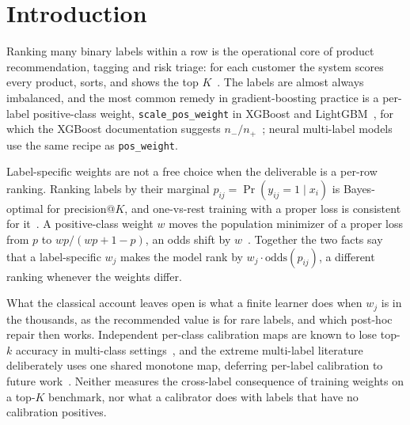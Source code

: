 \documentclass[sigconf,nonacm]{acmart}
\begin{document}
\maketitle

\section{Introduction}
\label{sec:intro}

Ranking many binary labels within a row is the operational core of product recommendation, tagging and risk triage: for each customer the system scores every product, sorts, and shows the top $K$~\cite{Jain2016XMLLoss,Menon2019Reductions}. The labels are almost always imbalanced, and the most common remedy in gradient-boosting practice is a per-label positive-class weight, \texttt{scale\_pos\_weight} in XGBoost and LightGBM~\cite{Chen2016XGBoost,Ke2017LightGBM}, for which the XGBoost documentation suggests $n_-/n_+$~\cite{XGBoostDocs}; neural multi-label models use the same recipe as \texttt{pos\_weight}.

Label-specific weights are not a free choice when the deliverable is a per-row ranking. Ranking labels by their marginal $p_{ij}=\Pr(y_{ij}=1\mid x_i)$ is Bayes-optimal for precision@$K$, and one-vs-rest training with a proper loss is consistent for it~\cite{Menon2019Reductions,Wydmuch2018PLT}. A positive-class weight $w$ moves the population minimizer of a proper loss from $p$ to $wp/(wp+1-p)$, an odds shift by $w$~\cite{Elkan2001,Saerens2002}. Together the two facts say that a label-specific $w_j$ makes the model rank by $w_j\cdot\mathrm{odds}(p_{ij})$, a different ranking whenever the weights differ.

What the classical account leaves open is what a finite learner does when $w_j$ is in the thousands, as the recommended value is for rare labels, and which post-hoc repair then works. Independent per-class calibration maps are known to lose top-$k$ accuracy in multi-class settings~\cite{Patel2021IMax}, and the extreme multi-label literature deliberately uses one shared monotone map, deferring per-label calibration to future work~\cite{Ullah2025XMLCCalib}. Neither measures the cross-label consequence of training weights on a top-$K$ benchmark, nor what a calibrator does with labels that have no calibration positives.
\end{document}
